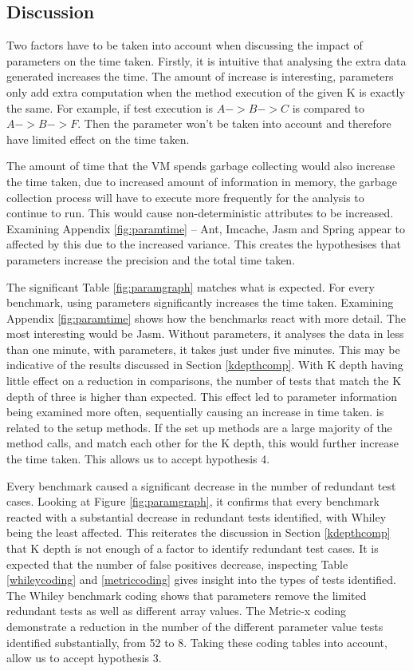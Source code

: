 \subsection{Discussion}
Two factors have to be taken into account when discussing the impact of parameters on the time taken. Firstly, it is intuitive that analysing the extra data generated increases the time. The amount of increase is interesting, parameters only add extra computation when the method execution of the given K is exactly the same. For example, if test execution is $A ->  B ->  C$ is compared to $A ->  B ->  F$. Then the parameter won't be taken into account and therefore have limited effect on the time taken. 

The amount of time that the VM spends garbage collecting would also increase the time taken, due to increased amount of information in memory, the garbage collection process will have to execute more frequently for the analysis to continue to run. This would cause non-deterministic attributes to be increased. Examining Appendix \ref{fig:paramtime} -- Ant, Imcache, Jasm and Spring appear to affected by this due to the increased variance. This creates the hypothesises that parameters increase the precision and the total time taken. 

The significant Table \ref{fig:paramgraph} matches what is expected. For every benchmark, using parameters significantly increases the time taken. Examining Appendix \ref{fig:paramtime} shows how the benchmarks react with more detail. The most interesting would be Jasm. Without parameters, it analyses the data in less than one minute, with parameters, it takes just under five minutes. This may be indicative of the results discussed in Section \ref{kdepthcomp}. With K depth having little effect on a reduction in comparisons, the number of tests that match the K depth of three is higher than expected. This effect led to parameter information being examined more often, sequentially causing an increase in time taken.  is related to the setup methods. If the set up methods are a large majority of the method calls, and match each other for the K depth, this would further increase the time taken. This allows us to accept hypothesis 4.

Every benchmark caused a significant decrease in the number of redundant test cases. Looking at Figure \ref{fig:paramgraph}, it confirms that every benchmark reacted with a substantial decrease in redundant tests identified, with Whiley being the least affected. This reiterates the discussion in Section \ref{kdepthcomp} that K depth is not enough of a factor to identify redundant test cases. It is expected that the number of false positives decrease, inspecting Table \ref{whileycoding} and \ref{metriccoding} gives insight into the types of tests identified. The Whiley benchmark coding shows that parameters remove the limited redundant tests as well as different array values. The Metric-x coding demonstrate a reduction in the number of the different parameter value tests identified substantially, from 52 to 8. Taking these coding tables into account, allow us to accept hypothesis 3.

